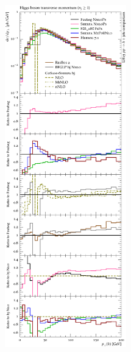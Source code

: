 \begin{figure}[p]
  \vspace*{-50pt}
  \centering
  \includegraphics[width=0.47\textwidth]{figures/hjetscomp_u_H_j_pT_incl.pdf}
  \hfill

\end{figure}
